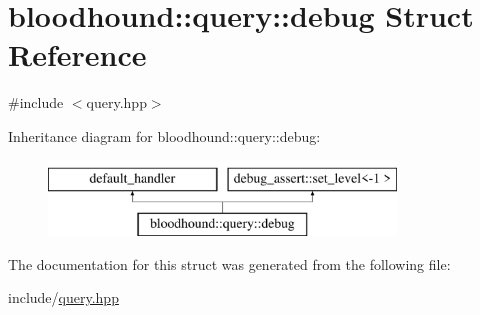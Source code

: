 \hypertarget{structbloodhound_1_1query_1_1debug}{}\section{bloodhound\+:\+:query\+:\+:debug Struct Reference}
\label{structbloodhound_1_1query_1_1debug}


{\ttfamily \#include $<$query.\+hpp$>$}

Inheritance diagram for bloodhound\+:\+:query\+:\+:debug\+:\begin{figure}[H]
\begin{center}
\leavevmode
\includegraphics[height=2.000000cm]{structbloodhound_1_1query_1_1debug}
\end{center}
\end{figure}


The documentation for this struct was generated from the following file\+:\begin{DoxyCompactItemize}
\item 
include/\mbox{\hyperlink{query_8hpp}{query.\+hpp}}\end{DoxyCompactItemize}

